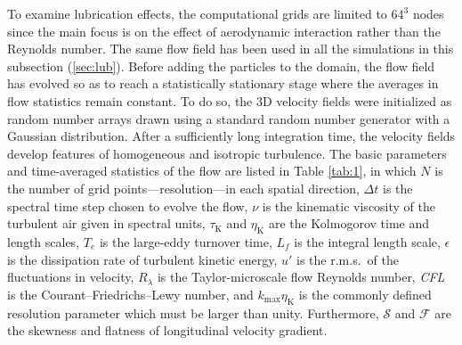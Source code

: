 \documentclass[../thesis.tex]{subfiles}
\begin{document}
To examine lubrication effects, the computational grids are limited to $64^3$ nodes since the main focus is on the effect of aerodynamic interaction rather than the Reynolds number. The same flow field has been used in all the simulations in this subsection (\ref{sec:lub}). Before adding the particles to the domain, the flow field has evolved so as to reach a statistically stationary stage where the averages in flow statistics remain constant. To do so, the 3D velocity fields were initialized as random number arrays drawn using a standard random number generator with a Gaussian distribution. After a sufficiently long integration time, the velocity fields develop features of homogeneous and isotropic turbulence. The basic parameters and time-averaged statistics of the flow are listed in Table \ref{tab:1}, in which $N$ is the number of grid points---resolution---in each spatial direction, $\Delta t$ is the spectral time step chosen to evolve the flow, $\nu$ is the kinematic viscosity of the turbulent air given in spectral units, $\tau_\text{K}$ and $\eta_\text{K}$ are the Kolmogorov time and length scales, $T_e$ is the large-eddy turnover time, $L_f$ is the integral length scale, $\epsilon$ is the dissipation rate of turbulent kinetic energy, $u'$ is the r.m.s.\ of the fluctuations in velocity, $R_\lambda$ is the Taylor-microscale flow Reynolds number, \textit{CFL} is the Courant--Friedrichs--Lewy number, and $k_\text{max}\eta_\text{K}$ is the commonly defined resolution parameter which must be larger than unity. Furthermore, $\mathcal{S}$ and $\mathcal{F}$ are the skewness and flatness of longitudinal velocity gradient.
\end{document}
